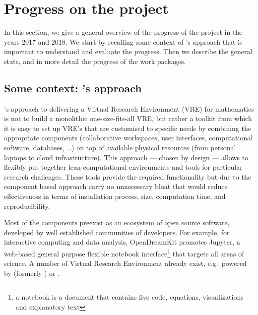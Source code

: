 \documentclass{deliverablereport}
\author{Nicolas M. Thiéry, Benoît Pilorget, et al.}
\begin{document}
\enlargethispage{4ex}
\maketitle
\githubissuedescription
\tableofcontents\newpage

\section{Progress on the project}

In this section, we give a general overview of the progress of the
project in the years 2017 and 2018. We start by recalling some context of \ODK's
approach that is important to understand and evaluate the
progress. Then we describe the general state, and in more detail
the progress of the work packages.

\subsection{Some context: \ODK's approach}
\ODK's approach to delivering a Virtual Research Environment (VRE) for
mathematics is not to build a monolithic one-size-fits-all VRE, but
rather a toolkit from which it is easy to set up VRE's that are
customised to specific needs by combining the appropriate components
(collaborative workspaces, user interfaces, computational software,
databases, \dots) on top of available physical resources (from
personal laptops to cloud infrastructure). This approach --- chosen by
design --- allows to flexibly put together lean computational
environments and tools for particular research challenges. These tools
provide the required functionality but due to the component based
approach carry no unnecessary bloat that would reduce effectiveness in
terms of installation process, size, computation time, and
reproducibility.

Most of the components preexist as an ecosystem of open source
software, developed by well established communities of developers. For
example, for interactive computing and data analysis, OpenDreamKit
promotes Jupyter, a web-based general purpose flexible notebook
interface\footnote{a notebook is a document that contains live code,
  equations, visualizations and explanatory text} that targets all
areas of science. A number of Virtual Research Environment already
exist, e.g.\ powered by \cocalc (formerly \SMC) or \JupyterHub.
\end{document}

